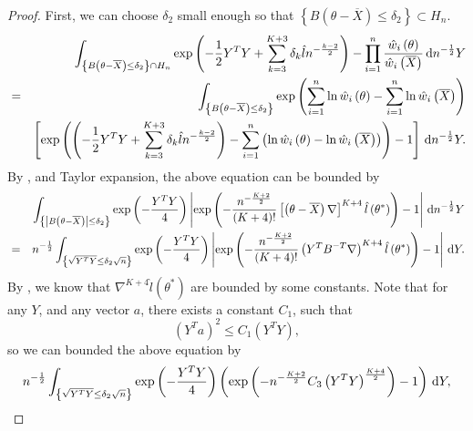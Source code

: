 \begin{proof}
First, we can choose $\delta_{2}$ small enough so that $\left\{ B\left(\theta-\overline{X}\right)\le\delta_{2}\right\} \subset H_{n}$.
\begin{eqnarray*}
 &  & \int_{\left\{ B\left(\theta-\overline{X}\right)\le\delta_{2}\right\} \cap H_{n}}\exp\left(-\frac{1}{2}Y^{T}Y+\sum_{k=3}^{K+3}\delta_{k}\hat{l}n^{-\frac{k-2}{2}}\right)-\prod_{i=1}^{n}\frac{\hat{w}_{i}\left(\theta\right)}{\hat{w}_{i}\left(\overline{X}\right)}\,\mathrm{d} n^{-\frac{1}{2}}Y\\
 & = & \int_{\left\{ B\left(\theta-\overline{X}\right)\le\delta_{2}\right\} }\exp\left(\sum_{i=1}^{n}\ln\hat{w}_{i}\left(\theta\right)-\sum_{i=1}^{n}\ln\hat{w}_{i}\left(\overline{X}\right)\right)\\
 &  & \left[\exp\left(\left(-\frac{1}{2}Y^{T}Y+\sum_{k=3}^{K+3}\delta_{k}\hat{l}n^{-\frac{k-2}{2}}\right)-\sum_{i=1}^{n}\left(\ln\hat{w}_{i}\left(\theta\right)-\ln\hat{w}_{i}\left(\overline{X}\right)\right)\right)-1\right]\,\mathrm{d} n^{-\frac{1}{2}}Y.
\end{eqnarray*}
By , and Taylor expansion, the
above equation can be bounded by 
\begin{eqnarray*}
 &  & \int_{\left\{ \left|B\left(\theta-\overline{X}\right)\right|\le\delta_{2}\right\} }\exp\left(-\frac{Y^{T}Y}{4}\right)\left|\exp\left(-\frac{n^{-\frac{K+2}{2}}}{\left(K+4\right)!}\left[\left(\theta-\overline{X}\right)\nabla\right]^{K+4}\hat{l}\left(\theta^{*}\right)\right)-1\right|\,\mathrm{d} n^{-\frac{1}{2}}Y\\
 & = & n^{-\frac{1}{2}}\int_{\left\{ \sqrt{Y^{T}Y}\le\delta_{2}\sqrt{n}\right\} }\exp\left(-\frac{Y^{T}Y}{4}\right)\left|\exp\left(-\frac{n^{-\frac{K+2}{2}}}{\left(K+4\right)!}\left(Y^{T}B^{-T}\nabla\right)^{K+4}\hat{l}\left(\theta^{*}\right)\right)-1\right|\,\mathrm{d} Y.
\end{eqnarray*}
By , we know that $\nabla^{K+4}\hat{l}\left(\theta^{*}\right)$
are bounded by some constants. Note that for any $Y$, and any vector
$a$, there exists a constant $C_{1}$, such that 
\begin{equation}
\left(Y^{T}a\right)^{2}\le C_{1}\left(Y^{T}Y\right),\label{eq:average-inequality}
\end{equation}
so we can bounded the above equation by 
\[
n^{-\frac{1}{2}}\int_{\left\{ \sqrt{Y^{T}Y}\le\delta_{2}\sqrt{n}\right\} }\exp\left(-\frac{Y^{T}Y}{4}\right)\left(\exp\left(-n^{-\frac{K+2}{2}}C_{3}\left(Y^{T}Y\right)^{\frac{K+4}{2}}\right)-1\right)\,\mathrm{d} Y,
\]
\end{proof}
